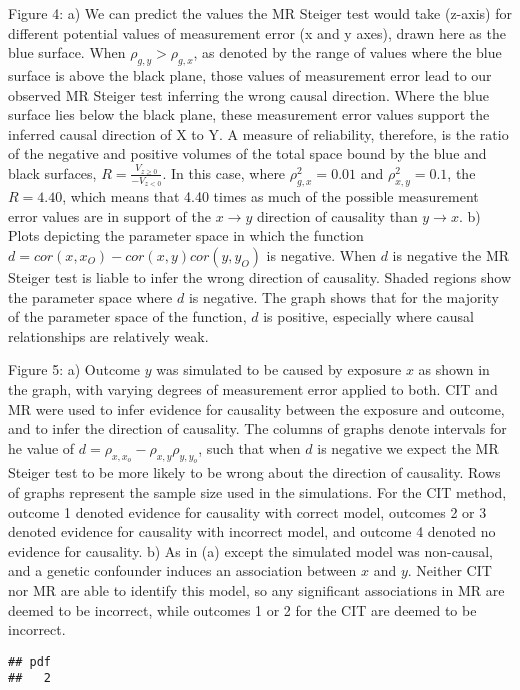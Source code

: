 \documentclass[]{article}
\begin{document}
Figure 4: a) We can predict the values the MR Steiger test would take
(z-axis) for different potential values of measurement error (x and y
axes), drawn here as the blue surface. When \(\rho_{g,y} > \rho_{g,x}\),
as denoted by the range of values where the blue surface is above the
black plane, those values of measurement error lead to our observed MR
Steiger test inferring the wrong causal direction. Where the blue
surface lies below the black plane, these measurement error values
support the inferred causal direction of X to Y. A measure of
reliability, therefore, is the ratio of the negative and positive
volumes of the total space bound by the blue and black surfaces,
\(R = \frac{V_{z \geq 0}}{ - V_{z < 0} }\). In this case, where
\(\rho_{g,x}^2 = 0.01\) and \(\rho_{x,y}^2 = 0.1\), the \(R = 4.40\),
which means that 4.40 times as much of the possible measurement error
values are in support of the \(x \rightarrow y\) direction of causality
than \(y \rightarrow x\). b) Plots depicting the parameter space in
which the function \(d = cor(x, x_O) - cor(x,y)cor(y, y_O)\) is
negative. When \(d\) is negative the MR Steiger test is liable to infer
the wrong direction of causality. Shaded regions show the parameter
space where \(d\) is negative. The graph shows that for the majority of
the parameter space of the function, \(d\) is positive, especially where
causal relationships are relatively weak.

Figure 5: a) Outcome \(y\) was simulated to be caused by exposure \(x\)
as shown in the graph, with varying degrees of measurement error applied
to both. CIT and MR were used to infer evidence for causality between
the exposure and outcome, and to infer the direction of causality. The
columns of graphs denote intervals for he value of
\(d = \rho_{x, x_o} - \rho_{x,y}\rho_{y,y_o}\), such that when \(d\) is
negative we expect the MR Steiger test to be more likely to be wrong
about the direction of causality. Rows of graphs represent the sample
size used in the simulations. For the CIT method, outcome 1 denoted
evidence for causality with correct model, outcomes 2 or 3 denoted
evidence for causality with incorrect model, and outcome 4 denoted no
evidence for causality. b) As in (a) except the simulated model was
non-causal, and a genetic confounder induces an association between
\(x\) and \(y\). Neither CIT nor MR are able to identify this model, so
any significant associations in MR are deemed to be incorrect, while
outcomes 1 or 2 for the CIT are deemed to be incorrect.

\begin{verbatim}
## pdf 
##   2
\end{verbatim}
\end{document}
